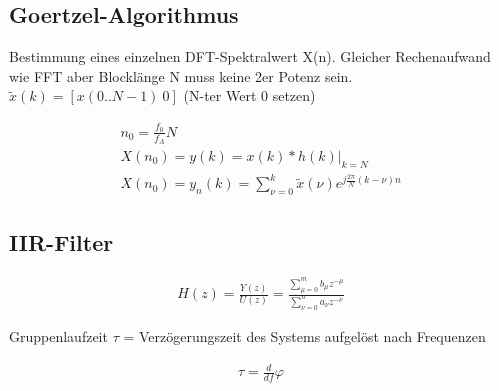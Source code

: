 \documentclass[10pt,a4paper]{article}
\begin{document}
\subsection{Goertzel-Algorithmus}
Bestimmung eines einzelnen DFT-Spektralwert X(n). Gleicher Rechenaufwand wie FFT aber Blocklänge N muss keine 2er Potenz sein. $\tilde{x}(k)=[x(0..N-1) \ 0]$ (N-ter Wert 0 setzen)
  \begin{mdframed}[style=exercise]
    \begin{align}
        n_0 = \frac{f_0}{f_A}N\\
        X(n_0)= y(k)=x(k)*h(k)|_{k=N}\\
        X(n_0)=y_n(k)=\sum_{\nu=0}^{k}\tilde{x}(\nu)e^{j\frac{2\pi}{N}(k-\nu)n}
    \end{align}
  \end{mdframed}
\subsection{IIR-Filter}
  \begin{mdframed}[style=exercise]
    \begin{align}
        H(z)=\frac{Y(z)}{U(z)}= \frac{\sum_{\mu=0}^{m} b_\mu z^{-\mu}}{\sum_{\nu=0}^{n} a_\nu z^{-\nu}}
    \end{align}
  \end{mdframed}
Gruppenlaufzeit $\tau$ = Verzögerungszeit des Systems aufgelöst nach Frequenzen
  \begin{mdframed}[style=exercise]
    \begin{align}
        \tau = \frac{d}{df}\varphi
    \end{align}
  \end{mdframed}
\end{document}
